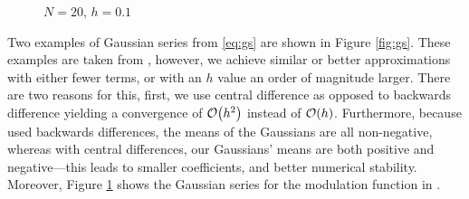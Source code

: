 \begin{figure}[tbp]

\caption[Gaussian series for a particular modulation function.]{$N = 20$, $h = 0.1$}
\label{fig:gaussmod}
\end{figure}

Two examples of Gaussian series from \eqref{eq:gs} are shown in Figure \ref{fig:gs}. These examples are taken from \cite{calcaterra2, calcaterra}, however, we achieve similar or better approximations with either fewer terms, or with an $h$ value an order of magnitude larger. There are two reasons for this, first, we use central difference as opposed to backwards difference yielding a convergence of $\bigO{h^2}$ instead of $\bigO{h}$. Furthermore, because \cite{calcaterra2, calcaterra} used backwards differences, the means of the Gaussians are all non-negative, whereas with central differences, our Gaussians' means are both positive and negative---this leads to smaller coefficients, and better numerical stability. Moreover, Figure \ref{fig:gaussmod} shows the Gaussian series for the modulation function in \cite{bohun, burgoyneemail}.

